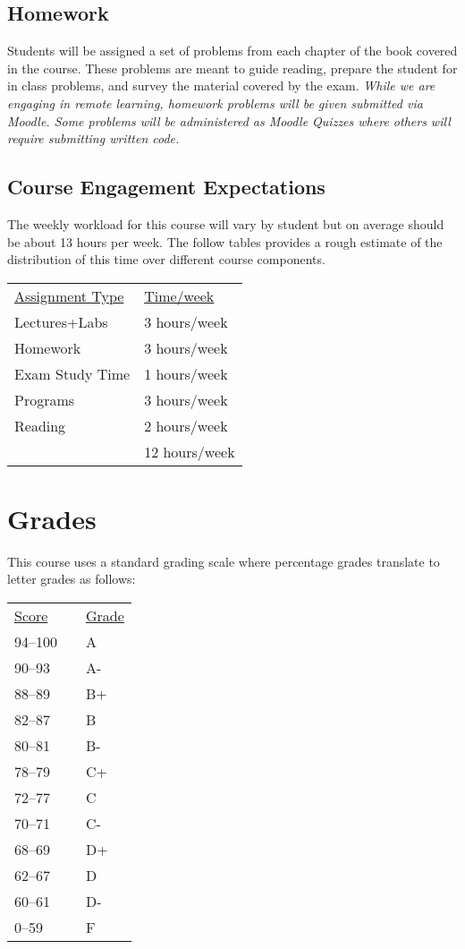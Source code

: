 \documentclass[10pt]{article}
\begin{document}
\subsection*{Homework}

Students will be assigned a set of problems from each chapter of the book covered in the course. These problems are meant to guide reading, prepare the student for in class problems, and survey the material covered by the exam. \textit{While we are engaging in remote learning, homework problems will be given submitted via Moodle. Some problems will be administered as Moodle Quizzes where others will require submitting written code.}


\subsection{Course Engagement Expectations}

The weekly workload for this course will vary by student but on average should be about 13 hours per week.  The follow tables provides a rough estimate of the distribution of this time over different course components.
\begin{center}
\begin{tabular}{ll}
\underline{Assignment Type} & \underline{Time/week} \\
Lectures+Labs       & 3 hours/week \\
Homework          & 3 hours/week \\
Exam Study Time    & 1 hours/week \\
Programs          & 3 hours/week \\
Reading &  2 hours/week \\
\bottomrule
 & 12 hours/week
\end{tabular}
\end{center}


\section{Grades}

This course uses a standard grading scale where percentage grades translate to letter grades as follows:

\begin{center}
\begin{small}
\begin{tabular}{lcl}
\underline{Score} & & \underline{Grade} \\
94--100 & & A \\
90--93 & & A- \\
88--89 & & B+ \\
82--87 & & B \\
80--81 & & B- \\
78--79 & & C+ \\
72--77 & & C \\
70--71 & & C- \\
68--69 & & D+ \\
62--67 & & D \\
60--61 & & D- \\
0--59 & & F
\end{tabular}
\end{small}
\end{center}
\end{document}
